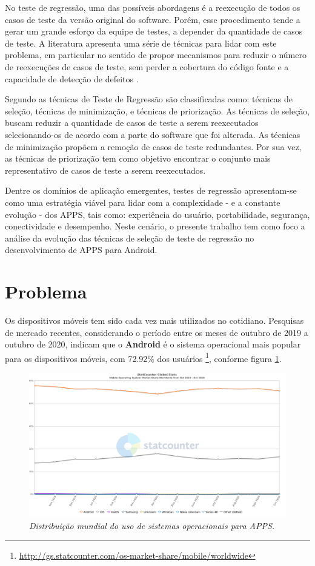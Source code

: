 No teste de regressão, uma das possíveis abordagens é a reexecução de todos os casos de teste da versão original do software. Porém, esse procedimento tende a gerar um grande esforço da equipe de testes, a depender da quantidade de casos de teste. A literatura apresenta uma série de técnicas para lidar com este problema, em particular no sentido de propor mecanismos para reduzir o número de reexecuções de casos de teste, sem perder a cobertura do código fonte e a capacidade de detecção de defeitos  \cite{Graves:2001:ESR:367008.367020,ENGSTROM201014,KAZMI2017,ROMANO201862}.

Segundo  as técnicas de Teste de Regressão são classificadas como: técnicas de seleção, técnicas de minimização, e técnicas de priorização. As técnicas de seleção, buscam reduzir a quantidade de casos de teste a serem reexecutados selecionando-os de acordo com a parte do software que foi alterada. As técnicas de minimização propõem a remoção de casos de teste redundantes. Por sua vez, as técnicas de priorização tem como objetivo encontrar o conjunto mais representativo de casos de teste a serem reexecutados.

Dentre os domínios de aplicação emergentes, testes de regressão apresentam-se como uma estratégia viável para lidar com a complexidade - e a constante evolução - dos \ac{APPS}, tais como: experiência do usuário, portabilidade, segurança, conectividade e desempenho. Neste cenário, o presente trabalho tem como foco a análise da evolução das técnicas de seleção de teste de regressão no desenvolvimento de \ac{APPS} para Android.

\section{Problema}\label{sec:problema}

Os dispositivos móveis tem sido cada vez mais utilizados no cotidiano. Pesquisas de mercado recentes, considerando o período entre os meses de outubro de 2019 a outubro de 2020, indicam que o \textbf{Android} é o sistema operacional mais popular para os dispositivos móveis, com 72.92\% dos usuários \footnote{\url{http://gs.statcounter.com/os-market-share/mobile/worldwide}}, conforme figura \ref{figure:usuariosAndroid}.

\begin{figure}[!htb]
\centering
\includegraphics[width=.8\textwidth]{images/usuariosAndroid.png}
\caption{\textit{Distribuição mundial do uso de sistemas operacionais para \ac{APPS}.}}
\label{figure:usuariosAndroid}
\end{figure}

